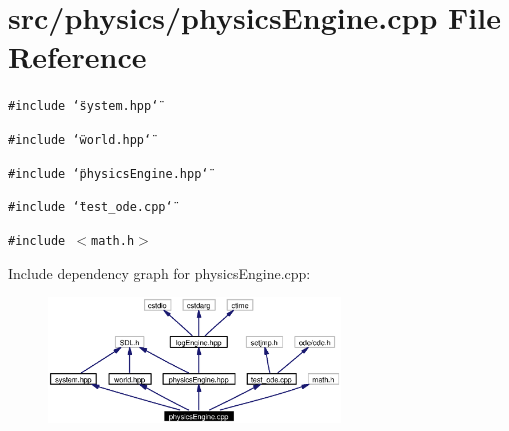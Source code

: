 \section{src/physics/physics\-Engine.cpp File Reference}
\label{physicsEngine_8cpp}
{\tt \#include \char`\"{}system.hpp\char`\"{}}\par
{\tt \#include \char`\"{}world.hpp\char`\"{}}\par
{\tt \#include \char`\"{}physics\-Engine.hpp\char`\"{}}\par
{\tt \#include \char`\"{}test\_\-ode.cpp\char`\"{}}\par
{\tt \#include $<$math.h$>$}\par


Include dependency graph for physics\-Engine.cpp:\begin{figure}[H]
\begin{center}
\leavevmode
\includegraphics[width=220pt]{physicsEngine_8cpp__incl}
\end{center}
\end{figure}

